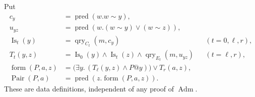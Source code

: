 \begin{definition}
\label{rel-pair-definition}
Put
\[
\begin{aligned}
 c_y&=\operatorname{pred}(w.w\sim y),\\
 u_{yz}&=\operatorname{pred}(w.(w\sim y)\lor(w\sim z)),\\
 \operatorname{Is}_t(y)&=\operatorname{qry}_{C_t}(m,c_y)
                         &&(t=0,\ell,r),\\
 T_t(y,z)&=\operatorname{Is}_0(y)\land
             \operatorname{Is}_t(z)\land
             \operatorname{qry}_{E_t}(m,u_{yz})
                         &&(t=\ell,r),\\
 \operatorname{form}(P,a,z)
       &=\bigl(\exists y.\,(T_\ell(y,z)\land P@y)\bigr)
                         \lor T_r(a,z),\\
 \operatorname{Pair}(P,a)&=
             \operatorname{pred}(z.\operatorname{form}(P,a,z)).
\end{aligned}
\]
These are data definitions, independent of any proof of
\(\operatorname{Adm}\).
\end{definition}

